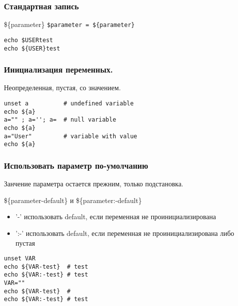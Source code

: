 

\begin{frame}[fragile]
	\frametitle{Стандартная запись}

	\begin{block}{\$\{parameter\}}
		{\tt \$parameter = \$\{parameter\}}

	\begin{lstlisting}
echo $USERtest
echo ${USER}test
	\end{lstlisting}
	\end{block}

\end{frame}

\begin{frame}[fragile]
	\frametitle{Инициализация переменных.}

	\begin{block}{Неопределенная, пустая, со значением.}
	\begin{lstlisting}
unset a          # undefined variable
echo ${a}
a="" ; a=''; a=  # null variable
echo ${a}
a="User"         # variable with value
echo ${a}
	\end{lstlisting}
	\end{block}

\end{frame}

\begin{frame}[fragile]
	\frametitle{ Использовать параметр по-умолчанию}

                Занчение параметра остается прежним, только подстановка.
	\begin{block}{\$\{parameter-default\} и \$\{parameter:-default\}}
	\begin{itemize}
		\item '-' использовать default, если переменная не проинициализирована
		\item ':-' использовать default, если переменная не проинициализирована либо пустая
	\end{itemize}
	\begin{lstlisting}
unset VAR
echo ${VAR-test}  # test
echo ${VAR:-test} # test
VAR=""
echo ${VAR-test}  #
echo ${VAR:-test} # test
	\end{lstlisting}
	\end{block}

\end{frame}

